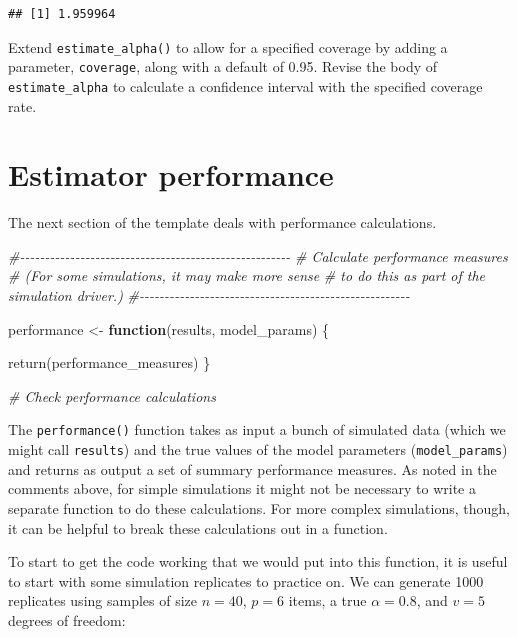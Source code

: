 \documentclass[
]{book}
\newenvironment{Shaded}{\begin{snugshade}}{\end{snugshade}}
\newcommand{\CommentTok}[1]{\textcolor[rgb]{0.56,0.35,0.01}{\textit{#1}}}
\newcommand{\ControlFlowTok}[1]{\textcolor[rgb]{0.13,0.29,0.53}{\textbf{#1}}}
\newcommand{\FunctionTok}[1]{\textcolor[rgb]{0.00,0.00,0.00}{#1}}
\newcommand{\NormalTok}[1]{#1}
\newcommand{\OtherTok}[1]{\textcolor[rgb]{0.56,0.35,0.01}{#1}}
\begin{document}
\begin{verbatim}
## [1] 1.959964
\end{verbatim}

Extend \texttt{estimate\_alpha()} to allow for a specified coverage by adding a parameter, \texttt{coverage}, along with a default of 0.95. Revise the body of \texttt{estimate\_alpha} to calculate a confidence interval with the specified coverage rate.

\hypertarget{estimator-performance}{%
\section{Estimator performance}\label{estimator-performance}}

The next section of the template deals with performance calculations.

\begin{Shaded}
\begin{Highlighting}[]
\CommentTok{\#{-}{-}{-}{-}{-}{-}{-}{-}{-}{-}{-}{-}{-}{-}{-}{-}{-}{-}{-}{-}{-}{-}{-}{-}{-}{-}{-}{-}{-}{-}{-}{-}{-}{-}{-}{-}{-}{-}{-}{-}{-}{-}{-}{-}{-}{-}{-}{-}{-}{-}{-}{-}{-}{-}}
\CommentTok{\# Calculate performance measures}
\CommentTok{\# (For some simulations, it may make more sense}
\CommentTok{\# to do this as part of the simulation driver.)}
\CommentTok{\#{-}{-}{-}{-}{-}{-}{-}{-}{-}{-}{-}{-}{-}{-}{-}{-}{-}{-}{-}{-}{-}{-}{-}{-}{-}{-}{-}{-}{-}{-}{-}{-}{-}{-}{-}{-}{-}{-}{-}{-}{-}{-}{-}{-}{-}{-}{-}{-}{-}{-}{-}{-}{-}{-}}

\NormalTok{performance }\OtherTok{\textless{}{-}} \ControlFlowTok{function}\NormalTok{(results, model\_params) \{}

  \FunctionTok{return}\NormalTok{(performance\_measures)}
\NormalTok{\}}

\CommentTok{\# Check performance calculations}
\end{Highlighting}
\end{Shaded}

The \texttt{performance()} function takes as input a bunch of simulated data (which we might call \texttt{results}) and the true values of the model parameters (\texttt{model\_params}) and returns as output a set of summary performance measures. As noted in the comments above, for simple simulations it might not be necessary to write a separate function to do these calculations. For more complex simulations, though, it can be helpful to break these calculations out in a function.

To start to get the code working that we would put into this function, it is useful to start with some simulation replicates to practice on.
We can generate 1000 replicates using samples of size \(n = 40\), \(p = 6\) items, a true \(\alpha = 0.8\), and \(v = 5\) degrees of freedom:
\end{document}
